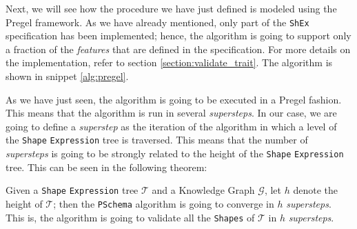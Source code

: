 Next, we will see how the procedure we have just defined is modeled using the Pregel framework. As we have already mentioned, only part of the \texttt{ShEx} specification has been implemented; hence, the algorithm is going to support only a fraction of the \textit{features} that are defined in the specification. For more details on the implementation, refer to section \ref{section:validate_trait}. The algorithm is shown in snippet \ref{alg:pregel}.

\label{alg:pregel}
\begin{pseudocode}
    
\end{pseudocode}

As we have just seen, the algorithm is going to be executed in a Pregel fashion. This means that the algorithm is run in several \textit{supersteps}. In our case, we are going to define a \textit{superstep} as the iteration of the algorithm in which a level of the \texttt{Shape} \texttt{Expression} tree is traversed. This means that the number of \textit{supersteps} is going to be strongly related to the height of the \texttt{Shape} \texttt{Expression} tree. This can be seen in the following theorem:

\begin{theorem}
    \label{theorem:convergence}
    Given a \texttt{Shape} \texttt{Expression} tree $\mathcal{T}$ and a Knowledge Graph $\mathcal{G}$, let $h$ denote the height of $\mathcal{T}$; then the \texttt{PSchema} algorithm is going to converge in $h$ \textit{supersteps}. This is, the algorithm is going to validate all the \texttt{Shapes} of $\mathcal{T}$ in $h$ \textit{supersteps}.
\end{theorem}

